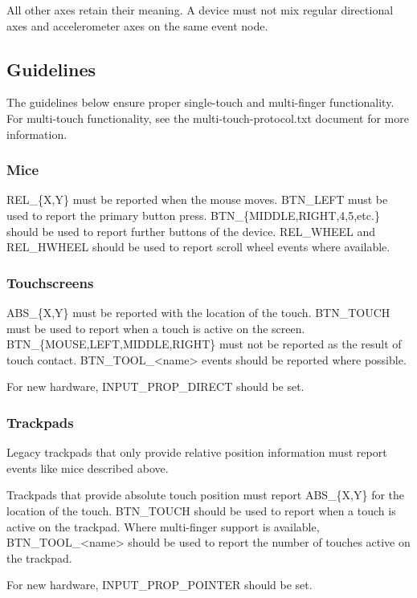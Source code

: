 \documentclass[a4paper,8pt,english]{sphinxmanual}
\begin{document}
All other axes retain their meaning. A device must not mix
regular directional axes and accelerometer axes on the same event node.


\subsection{Guidelines}
\label{input/event-codes:guidelines}
The guidelines below ensure proper single-touch and multi-finger functionality.
For multi-touch functionality, see the multi-touch-protocol.txt document for
more information.


\subsubsection{Mice}
\label{input/event-codes:mice}
REL\_\{X,Y\} must be reported when the mouse moves. BTN\_LEFT must be used to report
the primary button press. BTN\_\{MIDDLE,RIGHT,4,5,etc.\} should be used to report
further buttons of the device. REL\_WHEEL and REL\_HWHEEL should be used to report
scroll wheel events where available.


\subsubsection{Touchscreens}
\label{input/event-codes:touchscreens}
ABS\_\{X,Y\} must be reported with the location of the touch. BTN\_TOUCH must be
used to report when a touch is active on the screen.
BTN\_\{MOUSE,LEFT,MIDDLE,RIGHT\} must not be reported as the result of touch
contact. BTN\_TOOL\_\textless{}name\textgreater{} events should be reported where possible.

For new hardware, INPUT\_PROP\_DIRECT should be set.


\subsubsection{Trackpads}
\label{input/event-codes:trackpads}
Legacy trackpads that only provide relative position information must report
events like mice described above.

Trackpads that provide absolute touch position must report ABS\_\{X,Y\} for the
location of the touch. BTN\_TOUCH should be used to report when a touch is active
on the trackpad. Where multi-finger support is available, BTN\_TOOL\_\textless{}name\textgreater{} should
be used to report the number of touches active on the trackpad.

For new hardware, INPUT\_PROP\_POINTER should be set.
\end{document}
